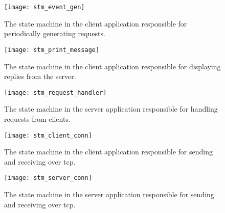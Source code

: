 \begin{appendices}
\begin{figure}[htp]
	\centering
	\begin{minipage}{0.45\linewidth}
		\texttt{[image: stm\_event\_gen]}
		\caption[Client ``request-generator'' state machine]{The state machine in the client application responsible for periodically generating requests.}
		\label{fig:stm_event_gen}
	\end{minipage}
	\quad
	\begin{minipage}{0.45\linewidth}
		\texttt{[image: stm\_print\_message]}
		\caption[Client ``print reply'' state machine]{The state machine in the client application responsible for displaying replies from the server.}
		\label{fig:stm_print_message}
	\end{minipage}
\end{figure}

\begin{figure}[htp]
	\centering
	\texttt{[image: stm\_request\_handler]}
	\caption[Server ``request-handler'' state machine]{The state machine in the server application responsible for handling requests from clients.}
	\label{fig:stm_request_handler}
\end{figure}

\begin{figure}[htp]
	\centering
	\begin{minipage}{0.45\linewidth}
		\texttt{[image: stm\_client\_conn]}
		\caption[Client TCP-socket state machine]{The state machine in the client application responsible for sending and receiving over \gls{tcp}.}
		\label{fig:stm_client_conn}
	\end{minipage}
	\quad
	\begin{minipage}{0.45\linewidth}
		\texttt{[image: stm\_server\_conn]}
		\caption[Server TCP-socket state machine]{The state machine in the server application responsible for sending and receiving over \gls{tcp}.}
		\label{fig:stm_server_conn}
	\end{minipage}
\end{figure}

\end{appendices}